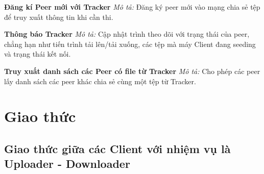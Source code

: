 \documentclass[a4paper]{article}
\begin{document}
    \textbf{Đăng kí Peer mới với Tracker}  
    \textit{Mô tả:} Đăng ký peer mới vào mạng chia sẻ tệp để truy xuất thông tin khi cần thi. 
    

    \textbf{Thông báo Tracker}  
    \textit{Mô tả:} Cập nhật trình theo dõi với trạng thái của peer, chẳng hạn như tiến trình tải lên/tải xuống, các tệp mà máy Client đang seeding và trạng thái kết nối.  
    
    \textbf{Truy xuất danh sách các Peer có file từ Tracker}  
    \textit{Mô tả:} Cho phép các peer lấy danh sách các peer khác chia sẻ cùng một tệp từ Tracker.  
    

\section{Giao thức}

    \subsection{Giao thức giữa các Client với nhiệm vụ là Uploader - Downloader}
\end{document}

